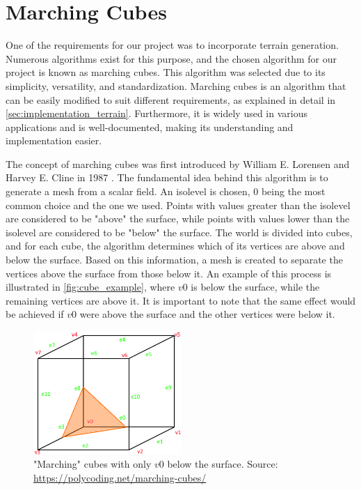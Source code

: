 \section{Marching Cubes} \label{sec:theory_theory_marching_cubes}
One of the requirements for our project was to incorporate terrain generation.
Numerous algorithms exist for this purpose, and the chosen algorithm for our project is known as marching cubes.
This algorithm was selected due to its simplicity, versatility, and standardization.
Marching cubes is an algorithm that can be easily modified to suit different requirements, as explained in detail in \autoref{sec:implementation_terrain}.
Furthermore, it is widely used in various applications and is well-documented, making its understanding and implementation easier.

The concept of marching cubes was first introduced by William E. Lorensen and Harvey E. Cline in 1987 \cite{Marching-Cubes}.
The fundamental idea behind this algorithm is to generate a mesh from a scalar field.
An isolevel is chosen, 0 being the most common choice and the one we used.
Points with values greater than the isolevel are considered to be "above" the surface, while points with values lower than the isolevel are considered to be "below" the surface.
The world is divided into cubes, and for each cube, the algorithm determines which of its vertices are above and below the surface.
Based on this information, a mesh is created to separate the vertices above the surface from those below it.
An example of this process is illustrated in \autoref{fig:cube_example}, where $v0$ is below the surface, while the remaining vertices are above it.
It is important to note that the same effect would be achieved if $v0$ were above the surface and the other vertices were below it.

\begin{figure}[h]
    \centering
    \includegraphics[width=0.5\textwidth]{chapters/theoretical_foundations/sections/marching_cubes/resources/cube-example.png}
    \caption["Marching" cubes with only $v0$ below the surface.]{"Marching" cubes with only $v0$ below the surface. Source: \url{https://polycoding.net/marching-cubes/}}
    \label{fig:cube_example}
\end{figure}

